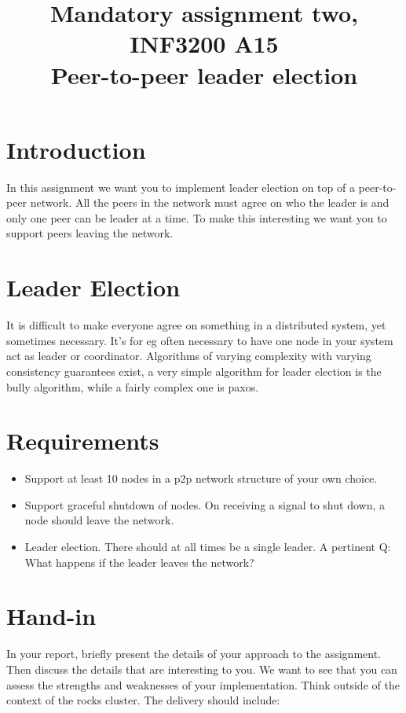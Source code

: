 \documentclass{article}
\begin{document}
\title{Mandatory assignment two, INF3200 A15\\
        Peer-to-peer leader election}
\maketitle


\section{Introduction}
In this assignment we want you to implement leader election on top of a
peer-to-peer network.  All the peers in the network must agree on who the
leader is and only one peer can be leader at a time. To make this interesting
we want you to support peers leaving the network.

\section{Leader Election}
It is difficult to make everyone agree on something in a distributed system,
yet sometimes necessary. It's for eg often necessary to have one node in your
system act as leader or coordinator. Algorithms of varying complexity with
varying consistency guarantees exist, a very simple algorithm for leader
election is the bully algorithm, while a fairly complex one is paxos.

\section{Requirements}
\begin{itemize}
    \item Support at least 10 nodes in a p2p network structure of your own
    choice.

    \item Support graceful shutdown of nodes. On receiving a signal to shut
    down, a node should leave the network.

    \item Leader election. There should at all times be a single leader.
    A pertinent Q: What happens if the leader leaves the network?
\end{itemize}

\section{Hand-in}
In your report, briefly present the details of your approach to the assignment.
Then discuss the details that are interesting to you. We want to see that you
can assess the strengths and weaknesses of your implementation. Think outside
of the context of the rocks cluster.  The delivery should include:
\end{document}
